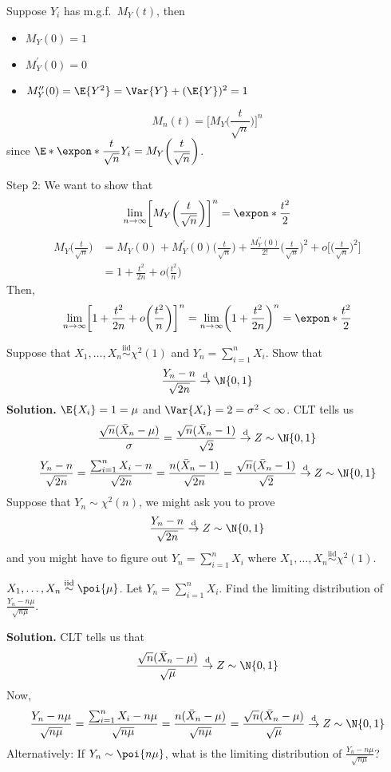 Suppose $ Y_i $ has m.g.f.\ $ M_Y(t) $, then
\begin{itemize}
    \item $ M_Y(0)=1 $
    \item $ M_Y^\prime(0)=0 $
    \item $ M_Y^{\prime\prime}(0)=\E{Y^2}=\Var{Y}+(\E{Y})^2=1 $
\end{itemize}
\[ M_n(t)=\biggl[M_Y\biggl( \frac{t}{\sqrt{n}} \biggr)\biggr]^n \]
since $
    \displaystyle \E*{\expon*{\frac{t}{\sqrt{n}}Y_i}}=M_Y\biggl(\frac{t}{\sqrt{n}}\biggr) $.

Step 2: We want to show that
\[ \lim\limits_{{n} \to {\infty}}
    \biggl[M_Y\biggl(\frac{t}{\sqrt{n}} \biggr)\biggr]^n=\expon*{\frac{t^2}{2}} \]
\begin{align*}
    M_Y\biggl(\frac{t}{\sqrt{n}} \biggr)
     & =M_Y(0)+M_Y^\prime(0)\biggl(\frac{t}{\sqrt{n}} \biggr)+
    \frac{M_Y^{\prime\prime}(0)}{2!}\biggl(\frac{t}{\sqrt{n}} \biggr)^2
    +o\biggl[\biggl(\frac{t}{\sqrt{n}} \biggr)^2\biggr]        \\
     & =1+\frac{t^2}{2n} +o\biggl(\frac{t^2}{n}\biggr)
\end{align*}
Then,
\[ \lim\limits_{{n} \to {\infty}}
    \biggl[1+\frac{t^2}{2n} +o\biggl(\frac{t^2}{n}\biggr)\biggr]^n=
    \lim\limits_{{n} \to {\infty}} \biggl(1+\frac{t^2}{2n}\biggr)^n=\expon*{\frac{t^2}{2}}  \]
\begin{Example}{}{}
    Suppose that $ X_1,\ldots,X_n \stackrel{\text{iid}}{\sim} \chi^2(1) $
    and $ Y_n=\sum_{i=1}^{n} X_i $. Show that
    \[ \frac{Y_n-n}{\sqrt{2n}} \stackrel{\text{d}}{\to}\N{0,1} \]
    \textbf{Solution.} $ \E{X_i}=1=\mu $ and $ \Var{X_i}=2=\sigma^2<\infty $.
    CLT tells us
    \[ \frac{\sqrt{n}(\bar{X}_n-\mu)}{\sigma}=
        \frac{\sqrt{n}(\bar{X}_n-1)}{\sqrt{2}}\stackrel{\text{d}}{\to}Z\sim \N{0,1} \]
    \[ \frac{Y_n-n}{\sqrt{2n}}=
        \frac{\sum_{i=1}^{n} X_i-n}{\sqrt{2n}}=\frac{n(\bar{X}_n-1)}{\sqrt{2n}}
        =\frac{\sqrt{n}(\bar{X}_n-1)}{\sqrt{2}}\stackrel{\text{d}}{\to}Z\sim\N{0,1}  \]
    Suppose that $ Y_n \sim \chi^2(n) $, we might ask you to prove
    \[ \frac{Y_n-n}{\sqrt{2n}} \stackrel{\text{d}}{\to}Z\sim \N{0,1} \]
    and you might have to figure out $ Y_n=\sum_{i=1}^{n} X_i $
    where $ X_1,\ldots,X_n\stackrel{\text{iid}}{\sim}\chi^2(1) $.
\end{Example}
\begin{Example}{}{}
    $ X_1,\ldots,X_n\stackrel{\text{iid}}{\sim}\poi{\mu} $.
    Let $ Y_n=\sum_{i=1}^{n} X_i $. Find the limiting
    distribution of $ \displaystyle \frac{Y_n-n\mu}{\sqrt{n\mu}} $.

    \textbf{Solution.} CLT tells us that
    \[ \frac{\sqrt{n}(\bar{X}_n-\mu)}{\sqrt{\mu}}\stackrel{\text{d}}{\to}Z\sim \N{0,1} \]
    Now,
    \[ \frac{Y_n-n\mu}{\sqrt{n\mu}}=
        \frac{\sum_{i=1}^{n} X_i-n\mu}{\sqrt{n\mu}}=
        \frac{n(\bar{X}_n-\mu)}{\sqrt{n\mu}}=
        \frac{\sqrt{n}(\bar{X}_n-\mu)}{\sqrt{\mu}}\stackrel{\text{d}}{\to}Z\sim \N{0,1}  \]
    Alternatively: If $ Y_n \sim \poi{n\mu} $, what is the limiting
    distribution of  $ \displaystyle \frac{Y_n-n\mu}{\sqrt{n\mu}} $?
\end{Example}
